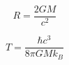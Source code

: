 \begin{equation}
    R=\frac{2GM}{c^2}
\end{equation}

\begin{equation}
    T=\frac{\hbar c^3}{8\pi GMk_B}
    \label{}
\end{equation}
